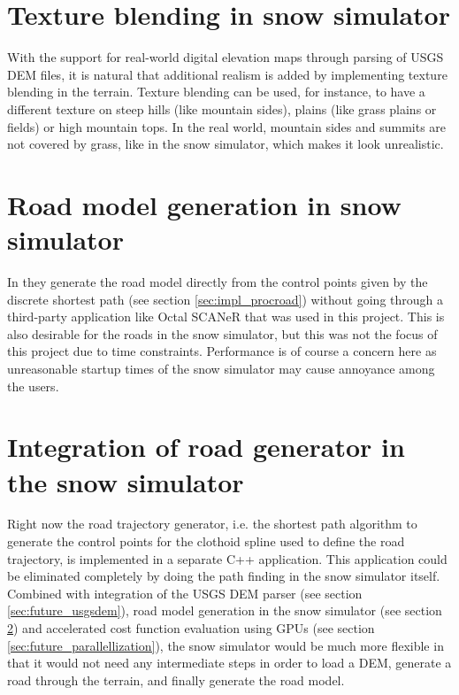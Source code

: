 \section{Texture blending in snow simulator}
With the support for real-world digital elevation maps through parsing of USGS DEM files, it is natural that additional realism is added by implementing texture blending in the terrain. Texture blending can be used, for instance, to have a different texture on steep hills (like mountain sides), plains (like grass plains or fields) or high mountain tops. In the real world, mountain sides and summits are not covered by grass, like in the snow simulator, which makes it look unrealistic.

\section{Road model generation in snow simulator}
\label{sec:future_roadmodel}
In \cite{roadgen} they generate the road model directly from the control points given by the discrete shortest path (see section \ref{sec:impl_procroad}) without going through a third-party application like Octal SCANeR that was used in this project. This is also desirable for the roads in the snow simulator, but this was not the focus of this project due to time constraints. Performance is of course a concern here as unreasonable startup times of the snow simulator may cause annoyance among the users.

\section{Integration of road generator in the snow simulator}
Right now the road trajectory generator, i.e. the shortest path algorithm to generate the control points for the clothoid spline used to define the road trajectory, is implemented in a separate C++ application. This application could be eliminated completely by doing the path finding in the snow simulator itself. Combined with integration of the USGS DEM parser (see section \ref{sec:future_usgsdem}), road model generation in the snow simulator (see section \ref{sec:future_roadmodel}) and accelerated cost function evaluation using GPUs (see section \ref{sec:future_parallellization}), the snow simulator would be much more flexible in that it would not need any intermediate steps in order to load a DEM, generate a road through the terrain, and finally generate the road model.

